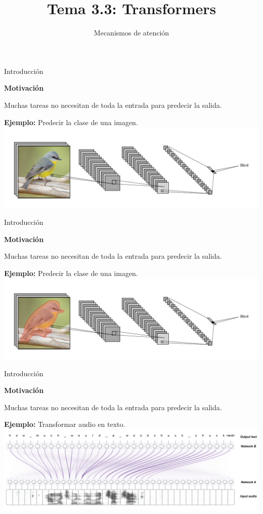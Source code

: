 \documentclass[aspectratio=169]{beamer}
\title{Tema 3.3: Transformers}
\subtitle{Mecanismos de atención}
\newenvironment{blockm}[1]{%
  \begin{block}{\textbf{#1}}%
  }{%
  \end{block}%
  \vspace{1em}%
}
\begin{document}
\begin{frame}[plain]
	\titlepage 
\end{frame}

\logo{}

\begin{frame}{Introducción}
  \begin{blockm}{Motivación}
    Muchas tareas no necesitan de toda la entrada para predecir la salida.
  \end{blockm}
  \textbf{Ejemplo:} Predecir la clase de una imagen.
  \includegraphics[width=\textwidth, center]{imgs/tema4/att/EX1.1.pdf}
\end{frame}

\begin{frame}{Introducción}
  \begin{blockm}{Motivación}
    Muchas tareas no necesitan de toda la entrada para predecir la salida.
  \end{blockm}
  \textbf{Ejemplo:} Predecir la clase de una imagen.
  \includegraphics[width=\textwidth, center]{imgs/tema4/att/EX1.2.pdf}
\end{frame}

\begin{frame}{Introducción}
  \begin{blockm}{Motivación}
    Muchas tareas no necesitan de toda la entrada para predecir la salida.
  \end{blockm}
  \textbf{Ejemplo:} Transformar audio en texto.
  \includegraphics[width=\textwidth, center]{imgs/tema4/att/EX2.png}
\end{frame}
\end{document}
